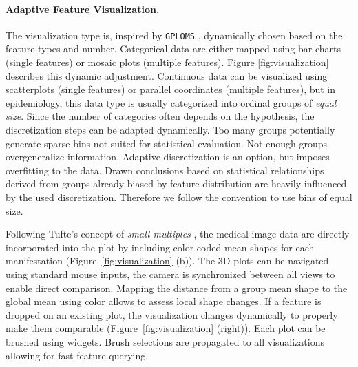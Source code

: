 \documentclass[journal]{style/vgtc} 			          %
\begin{document}
\paragraph{Adaptive Feature Visualization.} \label{sec:AdaptiveFeatureVisualization}
The visualization type is, inspired by \texttt{GPLOMS} \cite{Francois2013}, dynamically chosen based on the feature types and number.
%
Categorical data are either mapped using bar charts (single features) or mosaic plots (multiple features).
%
Figure \ref{fig:visualization} describes this dynamic adjustment.
%
Continuous data can be visualized using scatterplots (single features) or parallel coordinates (multiple features), but in epidemiology, this data type is usually categorized into ordinal groups of \emph{equal size}.
%
Since the number of categories often depends on the hypothesis, the discretization steps can be adapted dynamically.
%
Too many groups potentially generate sparse bins not suited for statistical evaluation. 
%
Not enough groups overgeneralize information.
%
Adaptive discretization is an option, but imposes overfitting to the data.
%
Drawn conclusions based on statistical relationships derived from groups already biased by feature distribution are heavily influenced by the used discretization.
%
Therefore we follow the convention to use bins of equal size. 

%
Following Tufte's concept of \emph{small multiples} \cite{Tufte1983}, the medical image data are directly incorporated into the plot by including color-coded mean shapes for each manifestation (Figure~\ref{fig:visualization} (b)).
%
The 3D plots can be navigated using standard mouse inputs, the camera is synchronized between all views to enable direct comparison.
%
Mapping the distance from a group mean shape to the global mean using color allows to assess local shape changes.
If a feature is dropped on an existing plot, the visualization changes dynamically to properly make them comparable (Figure~\ref{fig:visualization} (right)).
%
Each plot can be brushed using widgets.
%
Brush selections are propagated to all visualizations allowing for fast feature querying.
%
%
\end{document}
